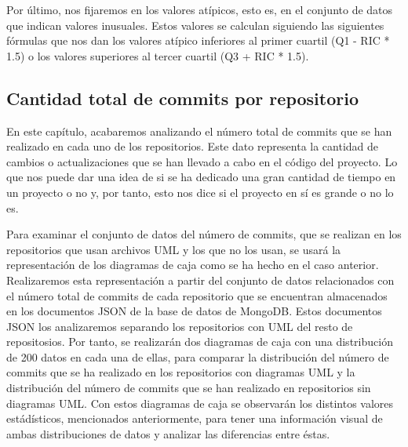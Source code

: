 \documentclass[a4paper, 12pt]{book}
\begin{document}
Por último, nos fijaremos en los valores atípicos, esto es, en el conjunto de datos que indican valores inusuales.
Estos valores se calculan siguiendo las siguientes fórmulas que nos dan los valores atípico inferiores al primer cuartil (Q1 - RIC * 1.5)  o los valores superiores al tercer cuartil (Q3 + RIC * 1.5). 



\subsection{Cantidad total de commits por repositorio} %
\label{sec:cantidad total de commits por repositorio}

En este capítulo, acabaremos analizando el número total de commits que se han realizado en cada uno de los repositorios.
Este dato representa la cantidad de cambios o actualizaciones que se han llevado a cabo en el código del proyecto.
Lo que nos puede dar una idea de si se ha dedicado una gran cantidad de tiempo en un proyecto o no y, por tanto, esto nos dice si el proyecto en sí es grande o no lo es. 


Para examinar el conjunto de datos del número de commits, que se realizan en los repositorios que usan archivos UML y los que no los usan, se usará la representación de  los diagramas de caja como se ha hecho en el caso anterior.
Realizaremos esta representación a partir del conjunto de datos relacionados con el número total de commits de cada repositorio que se encuentran almacenados en los documentos JSON de la base de datos de MongoDB.
Estos documentos JSON los analizaremos separando los repositorios con UML del resto de repositosios. 
Por tanto, se realizarán dos diagramas de caja con una distribución de 200 datos en cada una de ellas, para comparar la distribución del número de commits que se ha realizado en los repositorios con diagramas UML y la distribución del número de commits que se han realizado en repositorios sin diagramas UML.
Con estos diagramas de caja se observarán los distintos valores estádísticos, mencionados anteriormente, para tener una información visual de ambas distribuciones de datos y analizar las diferencias entre éstas.  


\end{document}
